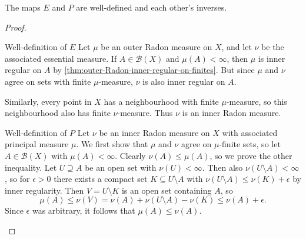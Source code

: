 \documentclass[article, a4paper, 11pt, oneside]{memoir}
\numberwithin{equation}{chapter}
\newcommand{\calB}{\mathcal{B}}
\newcommand{\borel}[1]{\calB(#1)}
\begin{document}
\newcommand{\mylistlabelfont}[1]{{\normalfont\color{linkcolor}\textit{#1}:}}

\begin{theorem}
    The maps $E$ and $P$ are well-defined and each other's inverses.
\end{theorem}

\begin{proof}
\begin{proofsec}
    \item[Well-definition of $E$]
    Let $\mu$ be an outer Radon measure on $X$, and let $\nu$ be the associated essential measure. If $A \in \borel{X}$ and $\mu(A) < \infty$, then $\mu$ is inner regular on $A$ by \cref{thm:outer-Radon-inner-regular-on-finites}. But since $\mu$ and $\nu$ agree on sets with finite $\mu$-measure, $\nu$ is also inner regular on $A$.

    Similarly, every point in $X$ has a neighbourhood with finite $\mu$-measure, so this neighbourhood also has finite $\nu$-measure. Thus $\nu$ is an inner Radon measure.

    \item[Well-definition of $P$]
    Let $\nu$ be an inner Radon measure on $X$ with associated principal measure $\mu$. We first show that $\mu$ and $\nu$ agree on $\mu$-finite sets, so let $A \in \borel{X}$ with $\mu(A) < \infty$. Clearly $\nu(A) \leq \mu(A)$, so we prove the other inequality. Let $U \supseteq A$ be an open set with $\nu(U) < \infty$. Then also $\nu(U \setminus A) < \infty$, so for $\epsilon > 0$ there exists a compact set $K \subseteq U \setminus A$ with $\nu(U \setminus A) \leq \nu(K) + \epsilon$ by inner regularity. Then $V = U \setminus K$ is an open set containing $A$, so
    \begin{equation*}
        \mu(A)
            \leq \nu(V)
            = \nu(A) + \nu(U \setminus A) - \nu(K)
            \leq \nu(A) + \epsilon.
    \end{equation*}
    Since $\epsilon$ was arbitrary, it follows that $\mu(A) \leq \nu(A)$.


\end{proofsec}
\end{proof}
\end{document}
